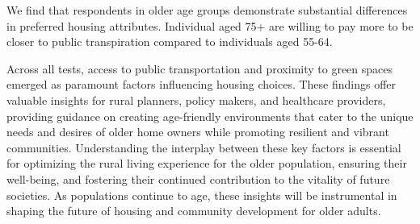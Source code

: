 \documentclass[3p,11pt ]{elsarticle}
\begin{document}
We find that respondents in older age groups demonstrate substantial differences in preferred housing attributes.
Individual aged 75+ are willing to pay more to be closer to public transpiration compared to individuals aged 55-64.

Across all tests, access to public transportation and proximity to green spaces emerged as paramount factors influencing housing choices. These findings offer valuable insights for rural planners, policy makers, and healthcare providers, providing guidance on creating age-friendly environments that cater to the unique needs and desires of older home owners while promoting resilient and vibrant communities. Understanding the interplay between these key factors is essential for optimizing the rural living experience for the older population, ensuring their well-being, and fostering their continued contribution to the vitality of future societies. As populations continue to age, these insights will be instrumental in shaping the future of housing and community development for older adults.

\newpage


\pagebreak




\end{document}
